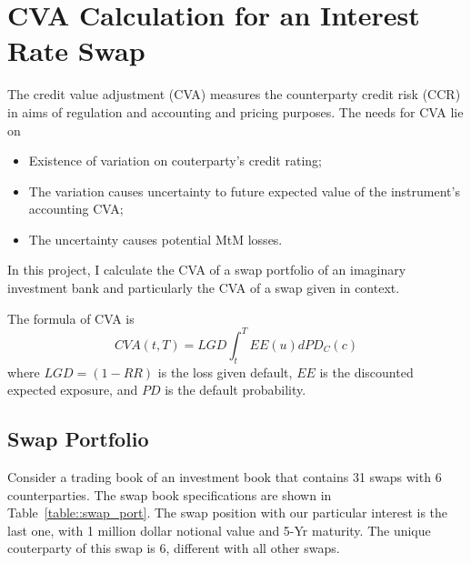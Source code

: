 \chapter{CVA Calculation for an Interest Rate Swap}\label{chap:cva}

The credit value adjustment (CVA) measures the counterparty credit risk (CCR) in aims of regulation and accounting and pricing purposes. The needs for CVA lie on

\begin{itemize}
  \item Existence of variation on couterparty's credit rating;
  \item The variation causes uncertainty to future expected value of the instrument's accounting CVA;
  \item The uncertainty causes potential MtM losses.
\end{itemize}

In this project, I calculate the CVA of a swap portfolio of an imaginary investment bank and particularly the CVA of a swap given in context.  

The formula of CVA is 
$$
CVA(t,T) = LGD \int_t^T EE(u) d PD_C(c)
$$
where $LGD=(1-RR)$ is the loss given default, $EE$ is the discounted expected exposure, and $PD$ is the default probability. 

\section{Swap Portfolio}
Consider a trading book of an investment book that contains 31 swaps with 6 counterparties. The swap book specifications are shown in Table~\ref{table::swap_port}. The swap position with our particular interest is the last one, with 1 million dollar notional value and 5-Yr maturity. The unique couterparty of this swap is 6, different with all other swaps.

